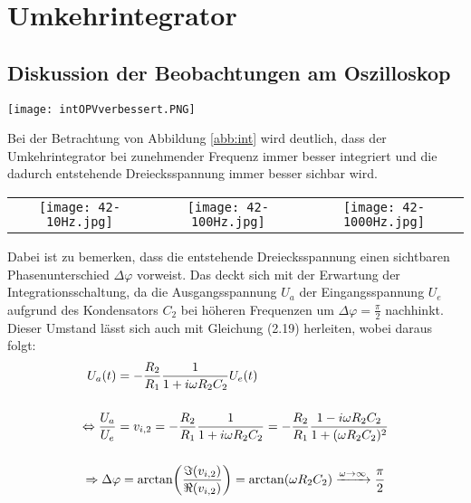 

\def\weite{4cm}

\section{Umkehrintegrator}


\subsection*{Diskussion der Beobachtungen am Oszilloskop}
\begin{center}
    \texttt{[image: intOPVverbessert.PNG]}
\end{center}
Bei der Betrachtung von Abbildung \ref{abb:int} wird deutlich, dass der Umkehrintegrator bei zunehmender Frequenz immer besser integriert und die dadurch entstehende Dreiecksspannung immer besser sichbar wird.
\begin{center}
    \begin{tabular}{c c c}
        \texttt{[image: 42-10Hz.jpg]} & \texttt{[image: 42-100Hz.jpg]} & \texttt{[image: 42-1000Hz.jpg]}
    \end{tabular}
    \label{abb:int}
\end{center}
Dabei ist zu bemerken, dass die entstehende Dreiecksspannung einen sichtbaren Phasenunterschied $\Delta\varphi$ vorweist. Das deckt sich mit der Erwartung der Integrationsschaltung, da die Ausgangsspannung $U_a$ der Eingangsspannung $U_e$ aufgrund des Kondensators $C_2$ bei höheren Frequenzen um $\Delta\varphi = \frac{\pi}{2}$ nachhinkt. Dieser Umstand lässt sich auch mit Gleichung (2.19) herleiten, wobei daraus folgt:
\begin{gather}
    \begin{aligned}
        U_a(t) &= - \frac{R_2}{R_1} \frac{1}{1+i\omega R_2 C_2} U_e(t)\\[0.5cm]
        \Leftrightarrow \frac{U_a}{U_e} &= v_{i,2} = - \frac{R_2}{R_1} \frac{1}{1+i\omega R_2 C_2} = - \frac{R_2}{R_1} \frac{1 - i\omega R_2 C_2}{1+(\omega R_2 C_2)^2}
    \end{aligned}\\[0.5cm]
    \Rightarrow \Delta\varphi = \arctan(\frac{\imaginary(v_{i,2})}{\real(v_{i,2})}) = \arctan(\omega R_2 C_2) \xrightarrow{\omega \rightarrow \infty} \frac{\pi}{2} 
\end{gather}
